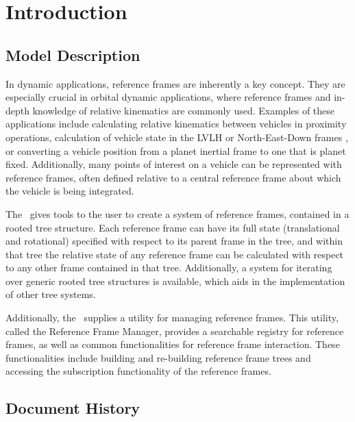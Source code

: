 \setcounter{chapter}{0}

\chapter{Introduction}\label{ch:intro}


\section{Model Description}

In dynamic applications, reference frames are inherently a key concept.
They are especially crucial in orbital dynamic applications, where
reference frames and in-depth knowledge of relative kinematics
are commonly used. Examples of these applications include calculating
relative kinematics between vehicles in proximity operations, calculation
of vehicle state in the LVLH or North-East-Down frames \cite{Vallado}, or
converting a vehicle position from a planet inertial frame to one that
is planet fixed. Additionally, many points of interest on a vehicle
can be represented with reference frames, often defined relative
to a central
reference frame about which the vehicle is being integrated.

The \ gives tools to the user to create a system
of reference frames, contained in a rooted tree structure. Each reference
frame can have its full state (translational and rotational) specified
with respect to its parent frame in the tree, and within that tree
the relative state of any reference frame can be calculated with respect
to any other frame contained in that tree. Additionally, a system
for iterating over generic rooted tree structures is available, which
aids in the implementation of other tree systems.

Additionally, the \ supplies a utility for managing reference frames.
This utility, called the Reference Frame Manager, provides a searchable registry
for reference frames, as well as common functionalities for reference frame interaction.
These functionalities include building and re-building reference frame trees and
accessing the subscription functionality of the reference frames.

\section{Document History}

